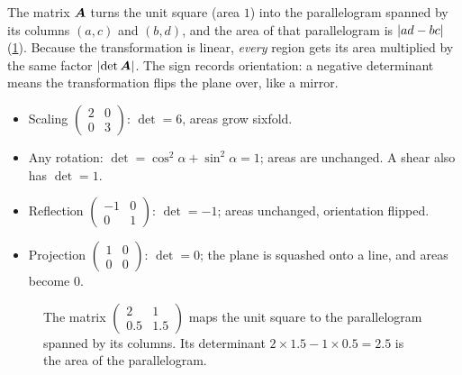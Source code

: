\begin{intuition}
The matrix $\bm{A}$ turns the unit square (area $1$) into the parallelogram
spanned by its columns $(a, c)$ and $(b, d)$, and the area of that
parallelogram is $\lvert ad - bc\rvert$ (\cref{fig:determinant}). Because the
transformation is linear, \emph{every} region gets its area multiplied by the
same factor $\lvert\det\bm{A}\rvert$. The sign records orientation: a negative
determinant means the transformation flips the plane over, like a mirror.
\begin{itemize}
  \item Scaling $\left(\begin{smallmatrix} 2 & 0\\ 0 & 3\end{smallmatrix}\right)$:
    $\det = 6$, areas grow sixfold.
  \item Any rotation: $\det = \cos^2\alpha + \sin^2\alpha = 1$; areas are
    unchanged. A shear also has $\det = 1$.
  \item Reflection $\left(\begin{smallmatrix} -1 & 0\\ 0 & 1\end{smallmatrix}\right)$:
    $\det = -1$; areas unchanged, orientation flipped.
  \item Projection $\left(\begin{smallmatrix} 1 & 0\\ 0 & 0\end{smallmatrix}\right)$:
    $\det = 0$; the plane is squashed onto a line, and areas become $0$.
\end{itemize}
\end{intuition}

\begin{figure}[htbp]
\centering
{}
\caption{The matrix $\left(\begin{smallmatrix} 2 & 1\\ 0.5 &
  1.5\end{smallmatrix}\right)$ maps the unit square to the parallelogram
  spanned by its columns. Its determinant $2\times1.5 - 1\times0.5 = 2.5$ is
  the area of the parallelogram.}
\label{fig:determinant}
\end{figure}

